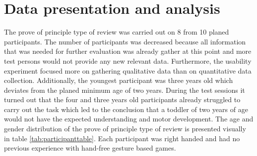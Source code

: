 \chapter{Data presentation and analysis}
\label{chap:dataanalysis}

The prove of principle type of review was carried out on 8 from 10 planed participants. The number of participants was decreased because all information that was needed for further evaluation was already gather at this point and more test persons would not provide any new relevant data. Furthermore, the usability experiment focused more on gathering qualitative data than on quantitative data collection. Additionally, the youngest participant was three years old which deviates from the planed minimum age of two years. During the test sessions it turned out that the four and three years old participants already struggled to carry out the task which led to the conclusion that a toddler of two years of age would not have the expected understanding and motor development. The age and gender distribution of the prove of principle type of review is presented visually in table \ref{tab:participanttable}. Each participant was right handed and had no previous experience with hand-free gesture based games.



